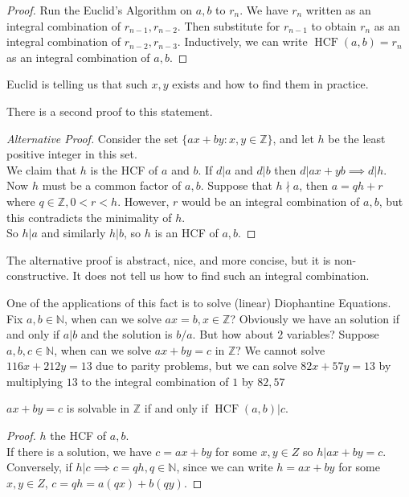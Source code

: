 \begin{proof}
    Run the Euclid's Algorithm on $a,b$ to $r_n$.
    We have $r_n$ written as an integral combination of $r_{n-1},r_{n-2}$.
    Then substitute for $r_{n-1}$ to obtain $r_n$ as an integral combination of $r_{n-2},r_{n-3}$.
    Inductively, we can write $\operatorname{HCF}(a,b)=r_n$ as an integral combination of $a,b$.
\end{proof}
\begin{remark}
    Euclid is telling us that such $x,y$ exists and how to find them in practice.
\end{remark}
There is a second proof to this statement.
\begin{proof}[Alternative Proof]
    Consider the set $\{ax+by:x,y\in\mathbb Z\}$, and let $h$ be the least positive integer in this set.\\
    We claim that $h$ is the HCF of $a$ and $b$.
    If $d|a$ and $d|b$ then $d|ax+yb\implies d|h$.\\
    Now $h$ must be a common factor of $a,b$.
    Suppose that $h\nmid a$, then $a=qh+r$ where $q\in\mathbb Z, 0<r<h$.
    However, $r$ would be an integral combination of $a,b$, but this contradicts the minimality of $h$.\\
    So $h|a$ and similarly $h|b$, so $h$ is an HCF of $a,b$.
\end{proof}
\begin{remark}
    The alternative proof is abstract, nice, and more concise, but it is non-constructive.
    It does not tell us how to find such an integral combination.
\end{remark}
One of the applications of this fact is to solve (linear) Diophantine Equations.\\
Fix $a,b\in\mathbb N$, when can we solve $ax=b,x\in\mathbb Z$?
Obviously we have an solution if and only if $a|b$ and the solution is $b/a$.
But how about $2$ variables?
Suppose $a,b,c\in\mathbb N$, when can we solve $ax+by=c$ in $\mathbb Z$?
We cannot solve $116x+212y=13$ due to parity problems, but we can solve $82x+57y=13$ by multiplying $13$ to the integral combination of $1$ by $82,57$
\begin{corollary}
    $ax+by=c$ is solvable in $\mathbb Z$ if and only if $\operatorname{HCF}(a,b)|c$.
\end{corollary}
\begin{proof}
    $h$ the HCF of $a,b$.\\
    If there is a solution, we have $c=ax+by$ for some $x,y\in Z$ so $h|ax+by=c$.
    Conversely, if $h|c\implies c=qh,q\in\mathbb N$, since we can write $h=ax+by$ for some $x,y\in Z$, $c=qh=a(qx)+b(qy)$. 
\end{proof}
